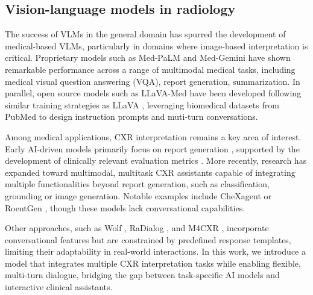 \subsection{Vision-language models in radiology}

 The success of VLMs in the general domain has spurred the development of medical-based VLMs, particularly in domains where image-based interpretation is critical. Proprietary models such as Med-PaLM\citep{singhal2023large} and Med-Gemini \citep{saab2024capabilities} have shown remarkable performance across a range of multimodal medical tasks, including medical visual question answering (VQA), report generation, summarization. In parallel, open source models such as LLaVA-Med \citep{li2023llava-med} have been developed following similar training strategies as LLaVA \citep{liu2023visual}, leveraging biomedical datasets from PubMed \citep{pubmed} to design instruction prompts and muti-turn conversations. 

Among medical applications, CXR interpretation remains a key area of interest. Early AI-driven models primarily focus on report generation \citep{nooralahzadeh2021progressive, alfarghaly2021automated, tanida2023interactive, chaves2024llavarad}, supported by the development of clinically relevant evaluation metrics \citep{jain2021radgraph, yu2023evaluating}. More recently, research has expanded toward multimodal, multitask CXR assistants capable of integrating multiple functionalities beyond report generation, such as classification, grounding or image generation. Notable examples include CheXagent \citep{chen2024chexagent} or RoentGen \citep{bluethgen2024vision}, though these models lack conversational capabilities. 

Other approaches, such as Wolf \citep{kang2024wolf}, RaDialog  \citep{pellegrini2023radialog}, and M4CXR \citep{chen2024chexagent}, incorporate conversational features but are constrained by predefined response templates, limiting their adaptability in real-world interactions. In this work, we introduce a model that integrates multiple CXR interpretation tasks while enabling flexible,  multi-turn dialogue, bridging the gap between task-specific AI models and interactive clinical assistants.